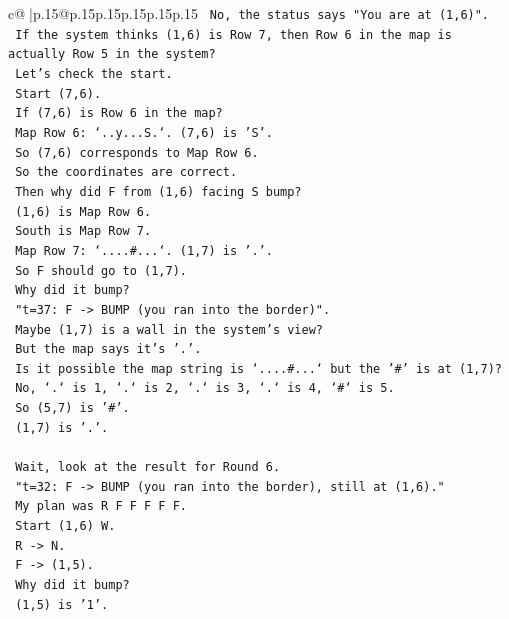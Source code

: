 \documentclass{article}
\begin{document}
{\begin{supertabular}{c@{$\;$}|p{.15\linewidth}@{}p{.15\linewidth}p{.15\linewidth}p{.15\linewidth}p{.15\linewidth}p{.15\linewidth}}
{{{\texttt{      No, the status says "You are at (1,6)".} \\
\texttt{      If the system thinks (1,6) is Row 7, then Row 6 in the map is actually Row 5 in the system?} \\
\texttt{      Let's check the start.} \\
\texttt{      Start (7,6).} \\
\texttt{      If (7,6) is Row 6 in the map?} \\
\texttt{      Map Row 6: `..y...S.`. (7,6) is 'S'.} \\
\texttt{      So (7,6) corresponds to Map Row 6.} \\
\texttt{      So the coordinates are correct.} \\
\texttt{      Then why did F from (1,6) facing S bump?} \\
\texttt{      (1,6) is Map Row 6.} \\
\texttt{      South is Map Row 7.} \\
\texttt{      Map Row 7: `....\#...`. (1,7) is '.'.} \\
\texttt{      So F should go to (1,7).} \\
\texttt{      Why did it bump?} \\
\texttt{      "t=37: F {-}> BUMP (you ran into the border)".} \\
\texttt{      Maybe (1,7) is a wall in the system's view?} \\
\texttt{      But the map says it's '.'.} \\
\texttt{      Is it possible the map string is `....\#...` but the '\#' is at (1,7)?} \\
\texttt{      No, `.` is 1, `.` is 2, `.` is 3, `.` is 4, `\#` is 5.} \\
\texttt{      So (5,7) is '\#'.} \\
\texttt{      (1,7) is '.'.} \\
\\ 
\texttt{      Wait, look at the result for Round 6.} \\
\texttt{      "t=32: F {-}> BUMP (you ran into the border), still at (1,6)."} \\
\texttt{      My plan was R F F F F F.} \\
\texttt{      Start (1,6) W.} \\
\texttt{      R {-}> N.} \\
\texttt{      F {-}> (1,5).} \\
\texttt{      Why did it bump?} \\
\texttt{      (1,5) is '1'.} \\
}}}
\end{supertabular}}
\end{document}
